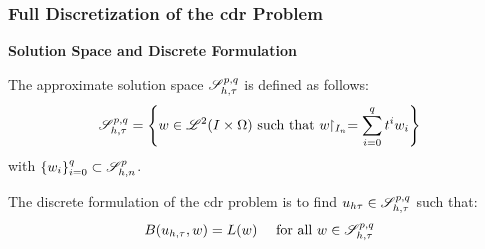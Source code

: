 \begin{frame}
    \frametitle{Full Discretization of the \acrshort{cdr} Problem}

    \vspace*{\fill}
    \begin{center}
        {\color{\accentcolor} \Large \textbf{Solution Space and Discrete Formulation}}
        \vspace*{0.25cm}

        \begin{minipage}{0.75\textwidth}
            \begin{definition}
                The approximate solution space $\mathscr{S}^{p, q}_{h, \tau}$ is defined as follows:
                \begin{align*}
                    \mathscr{S}^{p, q}_{h, \tau} = \left\{ w \in \mathscr{L}^{2}(I \times \Omega) \text{ such that } w \!\!\restriction_{I_n} = \sum_{i = 0}^q t^i w_i \right\}
                \end{align*}
                with $\left\{ w_i \right\}_{i = 0}^q \subset \mathscr{S}_{h, n}^p$.
            \end{definition}
        \end{minipage}
    \end{center}

    \vspace*{\fill}

    \begin{center}
        \begin{minipage}{0.75\textwidth}
            \begin{definition}
                The discrete formulation of the \acrshort{cdr} problem is to find $u_{h \tau} \in \mathscr{S}^{p, q}_{h, \tau}$ such that:
                \begin{align*}
                    B(u_{h, \tau}, w) &= L(w) &\text{ for all } w \in \mathscr{S}^{p, q}_{h, \tau}
                \end{align*}
            \end{definition}
        \end{minipage}
    \end{center}
    \vspace*{\fill}
    
\end{frame}

